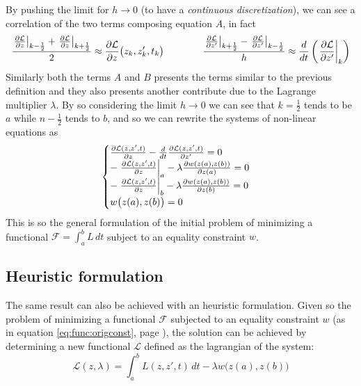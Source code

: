 	By pushing the limit for $h\rightarrow 0$ (to have a \textit{continuous discretization}), we can see a correlation of the two terms composing equation $A$, in fact
	\[	\dfrac{\left. \frac{\partial \mathcal L  }{\partial z} \right|_{k - \frac 1 2} + \left. \frac{\partial \mathcal L  }{\partial z} \right|_{k + \frac 1 2}}{2} \approx \frac{\partial \mathcal L  }{\partial z} \big(z_k,z_k',t_k\big) \qquad \qquad  \dfrac{\left. \frac{\partial \mathcal L  }{\partial z'} \right|_{k + \frac 1 2} - \left. \frac{\partial \mathcal L  }{\partial z'} \right|_{k - \frac 1 2}}{h} \approx \frac d{dt} \left( \left. \frac{\partial \mathcal L  }{\partial z'} \right|_k \right)  \]
	Similarly both the terms $A$ and $B$ presents the terms similar to the previous definition and they also presents another contribute due to the Lagrange multiplier $\lambda$. By so considering the limit $h\rightarrow 0$ we can see that $k=\frac 1 2$ tends to be $a$ while $n-\frac 1 2$ tends to $b$, and so we can rewrite the systems of non-linear equations as
	\[ \begin{cases}
		\frac{\partial \mathcal L   (z,z',t)}{\partial z} - \frac d{dt} \frac{\partial \mathcal L  (z,z',t)}{\partial z'} = 0 \\
		-\left.\frac{\partial \mathcal L  (z,z',t)}{\partial z}\right|_a - \lambda \frac{\partial w(z(a),z(b))}{\partial z(a)} = 0 \\
		-\left.\frac{\partial \mathcal L  (z,z',t)}{\partial z}\right|_b - \lambda \frac{\partial w(z(a),z(b))}{\partial z(b)} = 0 \\
		w\big(z(a),z(b)\big) = 0
	\end{cases} \]
	This is so the general formulation of the initial problem of minimizing a functional $\mathcal F = \int_a^b L \, dt$  subject to an equality constraint $w$. 
	
	\subsection*{Heuristic formulation} 
	The same result can also be achieved with an heuristic formulation. Given so the problem of minimizing a functional $\mathcal F$ subjected to an equality constraint $w$ (as in equation \ref{eq:func:origconst}, page \pageref{eq:func:origconst}), the solution can be achieved by determining a new functional $\mathcal L  $ defined as the lagrangian of the system:
	\begin{equation}
		\mathcal L  (z,\lambda) = \int_a^b L (z,z',t)\, dt - \lambda w\big(z(a),z(b)\big)
	\end{equation}
	
